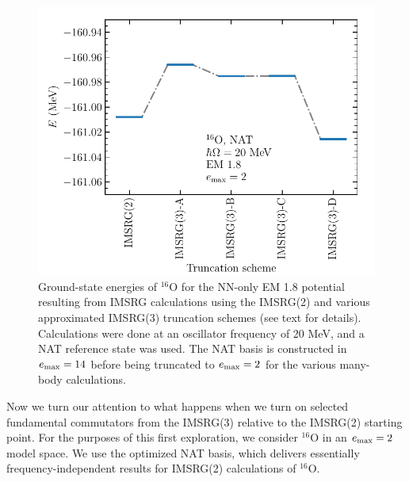 \begin{figure}[t!]
    \begin{center}
        \includegraphics{thesis/doc/images/term_by_term_o16_plot}
    \end{center}
    \caption{
        Ground-state energies
        of ${}^{16}\text{O}$
        for the NN-only EM 1.8 potential
        resulting from IMSRG calculations
        using the IMSRG(2)
        and various approximated IMSRG(3) truncation schemes (see text for details).
        Calculations were done at an oscillator frequency of 20 MeV,
        and a NAT reference state was used.
        The NAT basis is constructed in $e_{\text{max}}=14$
        before being truncated to $e_{\text{max}}=2$ for the various many-body calculations.
    }\label{fig:term_by_term_o16}
\end{figure}

Now we turn our attention to what happens
when we turn on selected fundamental commutators
from the IMSRG(3) relative to the IMSRG(2) starting point.
For the purposes of this first exploration,
we consider ${}^{16}\text{O}$ in an $e_{\text{max}}=2$ model space.
We use the optimized NAT basis,
which delivers essentially frequency-independent results
for IMSRG(2) calculations of ${}^{16}\text{O}$.

